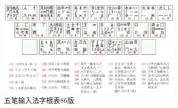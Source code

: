 \documentclass[UTF8, adobefonts, oneside]{ctexbook} \newcommand{\whzkjk}{\kaishu}
\newcommand\milinetwo[3]{\CJKgrid{\kaishu #1\color{gray!20}\whzkjk #1\color{white}\kaishu #1 #2\color{gray!20}\whzkjk #1\color{white}\kaishu #2 #2 #2 #3 #3 #3 #3 } }
\newcommand\miline[1]{\milinetwo{#1}{厂}{水}}
\begin{document}
\begin{figure}[ht]\centering
  \includegraphics[width=0.8\textwidth]{figures/wubi86}
  \caption{五笔输入法字根表86版} \label{fig:wubi}
\end{figure}






\end{document}
